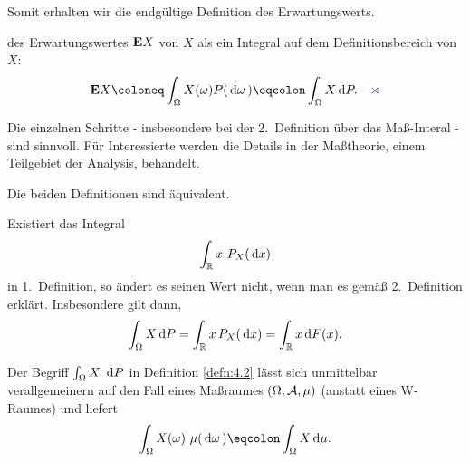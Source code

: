 Somit erhalten wir die endgültige Definition des Erwartungswerts. 

\begin{defn}
\label{defn:4.2}
des Erwartungswertes $\E X$ von $X$ als ein
Integral auf dem Definitionsbereich von $X$:
\begin{align*}
\E X \defl \int_{\Omega}X(\omega)P(\domega) \defr \int_{\Omega}
X\dP.\fishhere
\end{align*}
\end{defn}

\begin{bem}
\label{bem:4.1}
\begin{bemenum}
\item\label{bem:4.1:1}
Die einzelnen Schritte - insbesondere bei der 2.\ Definition über das
Maß-Interal - sind sinnvoll. Für Interessierte werden die Details in der
Maßtheorie, einem Teilgebiet der Analysis, behandelt.
\item\label{bem:4.1:2}
Die beiden Definitionen sind äquivalent.
\item\label{bem:4.1:3}
Existiert das  Integral
\begin{align*}
\int_{\R} x\ P_{X}(\dx)
\end{align*}
in 1.\ Definition, so ändert es seinen Wert nicht, wenn man es gemäß 2.\
Definition erklärt. Insbesondere gilt dann,
\begin{align*}
\int_\Omega X\dP = \int_\R x\, P_X(\dx) = \int_\R x \dF(x).
\end{align*}
\item\label{bem:4.1:4}
Der Begriff $\int_{\Omega}X\ \dP$ in Definition \ref{defn:4.2} lässt sich
unmittelbar verallgemeinern auf den Fall eines Maßraumes $(\Omega , \AA, \mu )$
(anstatt eines W-Raumes) und liefert
\begin{align*}
\int_{\Omega }X(\omega)\ \mu (\domega )\defr \int_{\Omega }
X \dmu.
\end{align*}


\end{bemenum}
\end{bem}
